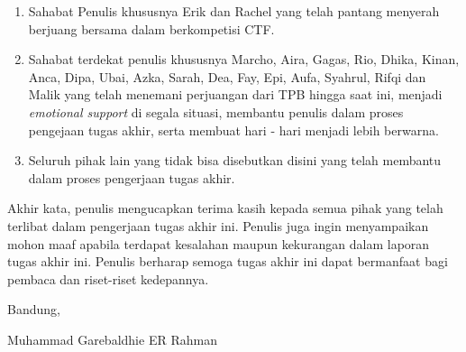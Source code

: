 \begin{enumerate}
	\item Sahabat Penulis khususnya Erik dan Rachel yang telah pantang menyerah berjuang bersama dalam berkompetisi CTF.
	\item Sahabat terdekat penulis khususnya Marcho, Aira, Gagas, Rio, Dhika, Kinan, Anca, Dipa, Ubai, Azka, Sarah, Dea, Fay, Epi, Aufa, Syahrul, Rifqi dan Malik yang telah menemani perjuangan dari TPB hingga saat ini, menjadi \textit{emotional support} di segala situasi, membantu penulis dalam proses pengejaan tugas akhir, serta membuat hari - hari menjadi lebih berwarna.
	\item Seluruh pihak lain yang tidak bisa disebutkan disini yang telah membantu dalam proses pengerjaan tugas akhir.
\end{enumerate}

Akhir kata, penulis mengucapkan terima kasih kepada semua pihak yang telah terlibat dalam pengerjaan tugas akhir ini. Penulis juga ingin menyampaikan mohon maaf apabila terdapat kesalahan maupun kekurangan dalam laporan tugas akhir ini. Penulis berharap semoga tugas akhir ini dapat bermanfaat bagi pembaca dan riset-riset kedepannya.

\begin{flushright}
	\vspace{0.5cm}
	Bandung, \tanggalpengesahan

	\vspace{1.5cm}

	Muhammad Garebaldhie ER Rahman
\end{flushright}